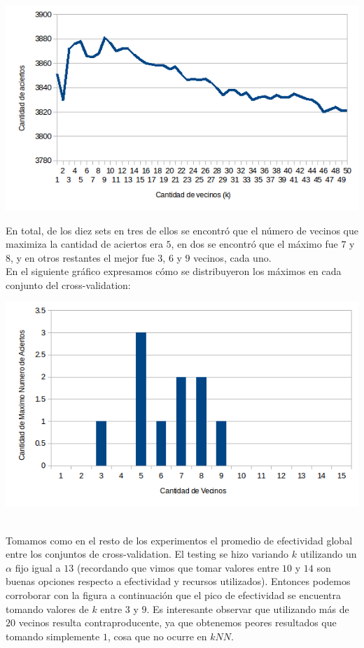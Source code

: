 \begin{center}
\includegraphics[scale=0.6]{nuevosResultados/pca/k/3.png}\\
\end{center}

En total, de los diez sets en tres de ellos se encontró que el número de vecinos que maximiza la cantidad de aciertos era $5$, en dos se encontró que el máximo fue $7$ y $8$, y en otros restantes el mejor fue $3$, $6$ y $9$ vecinos, cada uno.
\\
En el siguiente gráfico expresamos cómo se distribuyeron los máximos en cada conjunto del cross-validation:
\begin{center}
\includegraphics[scale=0.6]{nuevosResultados/pca/k/mejores.png}\\
\end{center}

\\
Tomamos como en el resto de los experimentos el promedio de efectividad global entre los conjuntos de cross-validation. El testing se hizo variando $k$ utilizando un $\alpha$ fijo igual a $13$ (recordando que vimos que tomar valores entre $10$ y $14$ son buenas opciones respecto a efectividad y recursos utilizados). Entonces podemos corroborar con la figura a continuación que el pico de efectividad se encuentra tomando valores de $k$ entre $3$ y $9$. Es interesante observar que utilizando más de $20$ vecinos resulta contraproducente, ya que obtenemos peores resultados que tomando simplemente $1$, cosa que no ocurre en $kNN$.

